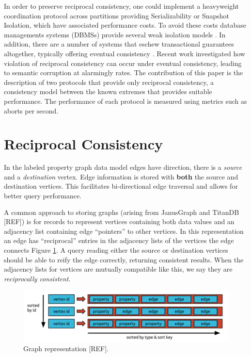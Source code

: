 \documentclass[sigplan,screen]{acmart}
\begin{document}
In order to preserve reciprocal consistency, one could implement a heavyweight coordination protocol across partitions providing Serializability or Snapshot Isolation, which have associated performance costs. To avoid these costs database managements systems (DBMSs) provide several weak isolation models \cite{Berenson1995}. In addition, there are a number of systems that eschew transactional guarantees altogether, typically offering eventual consistency \cite{Bailis2013}. Recent work \cite{Ezhilchelvan2018} investigated how violation of reciprocal consistency can occur under eventual consistency, leading to semantic corruption at alarmingly rates. The contribution of this paper is the description of two protocols that provide only reciprocal consistency, a consistency model between the known extremes that provides suitable performance. The performance of each protocol is measured using metrics such as aborts per second.


\section{Reciprocal Consistency}
\label{sec:recipr-cons}


In the labeled property graph data model edges have direction, there is a \textit{source} and a \textit{destination} vertex. Edge information is stored with \textbf{both} the source and destination vertices. This facilitates bi-directional edge traversal and allows for better query performance.

A common approach to storing graphs (arising from JanusGraph \cite{janusgraph} and TitanDB [REF]) is for records to represent vertices containing both data values and an adjacency list containing edge ``pointers'' to other vertices. In this representation an edge has ``reciprocal'' entries in the adjacency lists of the vertices the edge connects Figure \ref{adj-list}. A query reading either the source or destination vertices should be able to reify the edge correctly, returning consistent results. When the adjacency lists for vertices are mutually compatible like this, we say they are \emph{reciprocally consistent}.

\begin{figure}[h]
  \centering
  \includegraphics[width=\linewidth]{./images/janusgraph-adj-list}
  \caption{Graph representation [REF].}
  \label{adj-list}
\end{figure}
\end{document}

